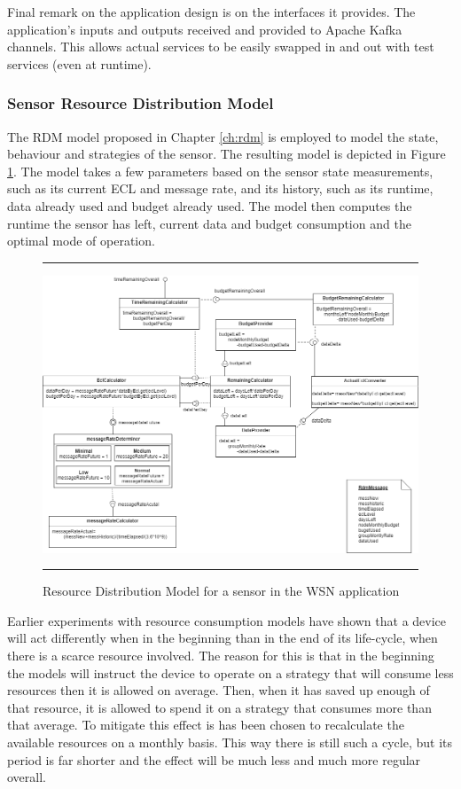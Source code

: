 Final remark on the application design is on the interfaces it provides. The application's inputs and outputs received and provided to Apache Kafka channels. This allows actual services to be easily swapped in and out with test services (even at runtime). 

\subsubsection{Sensor Resource Distribution Model}
The RDM model proposed in Chapter \ref{ch:rdm} is employed to model the state, behaviour and strategies of the sensor. The resulting model is depicted in Figure \ref{fig:sensit_rdm}. The model takes a few parameters based on the sensor state measurements, such as its current ECL and message rate, and its history, such as its runtime, data already used and budget already used. The model then computes the runtime the sensor has left, current data and budget consumption and the optimal mode of operation.

\begin{figure}
\centering
\hrule
\includegraphics[width=\textwidth]{resources/img/sensit_rdm.png}
\hrule
\caption{Resource Distribution Model for a sensor in the \idsystems \sensit WSN application}
\label{fig:sensit_rdm}
\end{figure}

Earlier experiments with resource consumption models have shown that a device will act differently when in the beginning than in the end of its life-cycle, when there is a scarce resource involved. The reason for this is that in the beginning the models will instruct the device to operate on a strategy that will consume less resources then it is allowed on average. Then, when it has saved up enough of that resource, it is allowed to spend it on a strategy that consumes more than that average. To mitigate this effect is has been chosen to recalculate the available resources on a monthly basis. This way there is still such a cycle, but its period is far shorter and the effect will be much less and much more regular overall.

